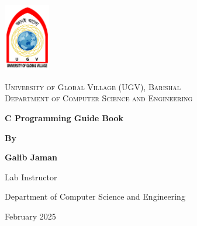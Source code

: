 \documentclass[12pt, openany]{book}
\author{
    \textbf{Galib Jaman}\\
}
\date{August 2024}
\begin{document}
\begin{titlepage}
    \centering
    \includegraphics[width=0.15\textwidth]{logo.jpg} %

    \vspace{1.5cm}

    {\Large \textsc{University of Global Village (UGV), Barishal}} \\[0.3cm]
    {\large \textsc{Department of Computer Science and Engineering}} \\[0.5cm]

    \vspace{2cm}

    {\Huge \textbf{C Programming Guide Book} \par}

    \vspace{2.5cm}

    {\large \textbf{By} \par}
    \vspace{1cm}
    {\large \textbf{Galib Jaman} \par}
    \vspace{10pt}
    {\normalsize Lab Instructor \par}
    {\normalsize Department of Computer Science and Engineering \par}

    \vfill %

    {\Large February 2025}
\end{titlepage}


\onehalfspacing
\tableofcontents

\titleformat{\section}{\normalsize\bfseries}{\thesection}{1em}{}
\titleformat{\subsection}{\normalsize\bfseries}{\thesubsection}{1em}{}
\end{document}
